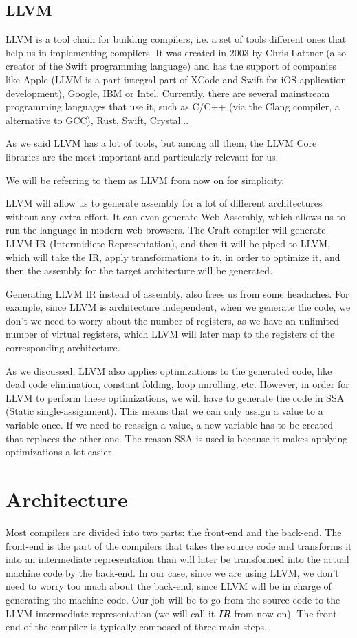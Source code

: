 ﻿\documentclass[10pt,a4paper,twocolumn,twoside]{article}
\begin{document}
\subsection{LLVM}
LLVM is a tool chain for building compilers, i.e. a set of tools different ones
that help us in implementing compilers. It was created in 2003 by Chris Lattner
(also creator of the Swift programming language) and has the support of
companies like Apple (LLVM is a part integral part of XCode and Swift for iOS
application development), Google, IBM or Intel. Currently, there are several
mainstream programming languages that use it, such as C/C++ (via the Clang
compiler, a alternative to GCC), Rust, Swift, Crystal...

As we said LLVM has a lot of tools, but among all them, the LLVM Core libraries
are the most important and particularly relevant for us. 

We will be referring to 
them as LLVM from now on for simplicity. 

LLVM will allow us to generate assembly for a lot of different architectures
without any extra effort. It can even generate Web Assembly, which allows us to
run the language in modern web browsers. The Craft compiler will generate LLVM
IR (Intermidiete Representation), and then it will be piped to LLVM, which will
take the IR, apply transformations to it, in order to optimize it, and then
the assembly for the target architecture will be generated.

Generating LLVM IR instead of assembly, also frees us from some headaches. For
example, since LLVM is architecture independent, when we generate the code, we
don't we need to worry about the number of registers, as we have an unlimited
number of virtual registers, which LLVM will later map to the registers of the
corresponding architecture.

As we discussed, LLVM also applies optimizations to the generated code, like
dead code elimination, constant folding, loop unrolling, etc. However, in order
for LLVM to perform these optimizations, we will have to generate the code in
SSA (Static single-assignment). This means that we can only assign a value to a
variable once. If we need to reassign a value, a new variable has to be created
that replaces the other one. The reason SSA is used is because it makes 
applying optimizations a lot easier.

\section{Architecture}
Most compilers are divided into two parts: the front-end and the back-end. The
front-end is the part of the compilers that takes the source code and transforms
it into an intermediate representation than will later be transformed into the
actual machine code by the back-end. In our case, since we are using LLVM, we
don't need to worry too much about the back-end, since LLVM will be in charge of
generating the machine code. Our job will be to go from the source code to the
LLVM intermediate representation (we will call it \textbf{\textit{IR}} from now
on). The front-end of the compiler is typically composed of three main steps.
\end{document}
